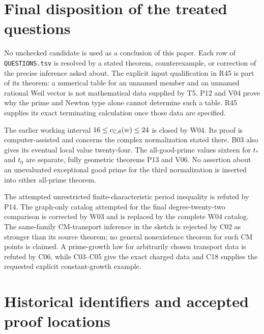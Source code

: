 \section{Final disposition of the treated questions}

No unchecked candidate is used as a conclusion of this paper. Each row of
\texttt{QUESTIONS.tsv} is resolved by a stated theorem,
counterexample, or correction of the precise inference asked about.
The explicit input qualification in R45 is part of its theorem: a numerical
table for an unnamed member and an unnamed rational Weil vector is not
mathematical data supplied by T5. P12 and V04 prove why the prime and Newton
type alone cannot determine such a table. R45 supplies its exact terminating
calculation once those data are specified.

The earlier working interval $16\leq c_{\mathbb C,\theta}(w)\leq24$ is closed
by W04. Its proof is computer-assisted and concerns the complex
normalization stated there. B03 also gives its eventual local value
twenty-four. The all-good-prime values sixteen for $t_*$ and $t_0$ are
separate, fully geometric theorems P13 and V06. No assertion about an
unevaluated exceptional good prime for the third normalization is inserted
into either all-prime theorem.

The attempted unrestricted finite-characteristic period inequality is
refuted by P14. The graph-only catalog attempted for the final
degree-twenty-two comparison is corrected by W03 and is replaced by the
complete W04 catalog. The same-family CM-transport inference in the
sketch is rejected by C02 as stronger than its source theorem; no
general nonexistence theorem for such CM points is claimed. A
prime-growth law for arbitrarily chosen transport data is refuted by
C06, while C03--C05 give the exact charged data and C18 supplies the
requested explicit constant-growth example.

\section{Historical identifiers and accepted proof locations}

